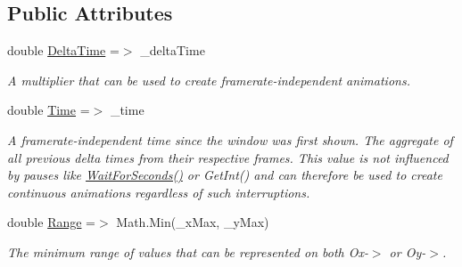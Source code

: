 \subsection*{Public Attributes}
\begin{DoxyCompactItemize}
\item 
double \mbox{\hyperlink{class_s_g_l_1_1_graph_a33da47cd9863c9a94953474ac52b02f8}{Delta\+Time}} =$>$ \+\_\+delta\+Time
\begin{DoxyCompactList}\small\item\em A multiplier that can be used to create framerate-\/independent animations. \end{DoxyCompactList}\item 
double \mbox{\hyperlink{class_s_g_l_1_1_graph_a900eb624d0906d4e14a0f0a0be4ad791}{Time}} =$>$ \+\_\+time
\begin{DoxyCompactList}\small\item\em A framerate-\/independent time since the window was first shown. The aggregate of all previous delta times from their respective frames. This value is not influenced by pauses like \mbox{\hyperlink{class_s_g_l_1_1_graph_aac0d51ab73e1f78788e9ecb6afc9d532}{Wait\+For\+Seconds()}} or Get\+Int() and can therefore be used to create continuous animations regardless of such interruptions. \end{DoxyCompactList}\item 
double \mbox{\hyperlink{class_s_g_l_1_1_graph_a9f890698937c413d4892d7ad7e674f15}{Range}} =$>$ Math.\+Min(\+\_\+x\+Max, \+\_\+y\+Max)
\begin{DoxyCompactList}\small\item\em The minimum range of values that can be represented on both Ox-\/$>$ or Oy-\/$>$. \end{DoxyCompactList}\end{DoxyCompactItemize}
